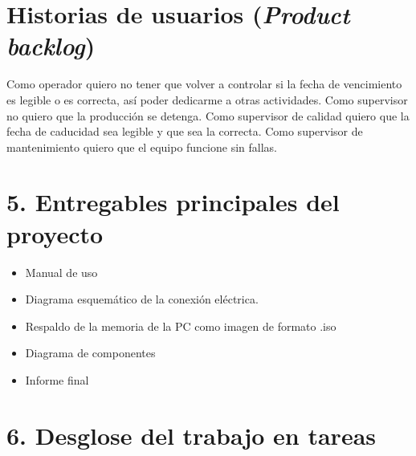 \documentclass[11pt]{charter}
\begin{document}

\section{Historias de usuarios (\textit{Product backlog})}
\label{sec:backlog}


Como operador quiero no tener que volver a controlar si la fecha de vencimiento es legible o es correcta, así poder dedicarme a otras actividades.\newline
Como supervisor no quiero que la producción se detenga. \newline
Como supervisor de calidad quiero que la fecha de caducidad sea legible y que sea la correcta.\newline
Como supervisor de mantenimiento quiero que el equipo funcione sin fallas. 



\section{5. Entregables principales del proyecto}
\label{sec:entregables}

\begin{itemize}
\item Manual de uso
\item Diagrama esquemático de la conexión eléctrica. 
\item Respaldo de la memoria de la PC como imagen de formato .iso
\item Diagrama de componentes
\item Informe final

\end{itemize}

\newpage
\section{6. Desglose del trabajo en tareas}
\label{sec:wbs}

\end{document}
